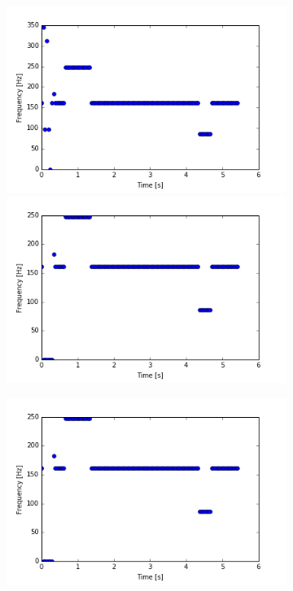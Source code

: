 \begin{figure}[H]
\centering
\begin{subfigure}{0.49\textwidth}
\centering
\includegraphics[width=\textwidth]{figures/peak_detection/peak_lim1.png}
\caption{}
\label{fig:freq_-3dB_Amp_pass}

\includegraphics[width=\textwidth]{figures/peak_detection/peak_lim2.png}
\caption{}
\label{fig:freq_10dB_Amp_pass}

\end{subfigure}
\begin{subfigure}{0.49\textwidth}
\centering
\includegraphics[width=\textwidth]{figures/peak_detection/peak_lim3.png}
\caption{}
\label{fig:freq_15dB_Amp_pass}


\end{subfigure}
\end{figure}

